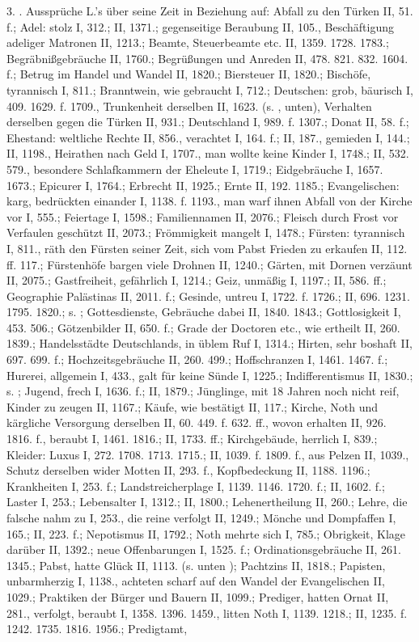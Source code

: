 3. . Aussprüche L.’s über seine Zeit in Beziehung auf: Abfall zu den Türken II, 51. f.; Adel: stolz I, 312.; II, 1371.; gegenseitige Beraubung II, 105., Beschäftigung adeliger Matronen II, 1213.; Beamte, Steuerbeamte etc. II, 1359. 1728. 1783.; Begräbnißgebräuche II, 1760.; Begrüßungen und Anreden II, 478. 821. 832. 1604. f.; Betrug im Handel und Wandel II, 1820.; Biersteuer II, 1820.; Bischöfe, tyrannisch I, 811.; Branntwein, wie gebraucht I, 712.; Deutschen: grob, bäurisch I, 409. 1629. f. 1709., Trunkenheit derselben II, 1623. (s. , unten), Verhalten derselben gegen die Türken II, 931.; Deutschland I, 989. f. 1307.; Donat II, 58. f.; Ehestand: weltliche Rechte II, 856., verachtet I, 164. f.; II, 187., gemieden I, 144.; II, 1198., Heirathen nach Geld I, 1707., man wollte keine Kinder I, 1748.; II, 532. 579., besondere Schlafkammern der Eheleute I, 1719.; Eidgebräuche I, 1657. 1673.; Epicurer I, 1764.; Erbrecht II, 1925.; Ernte II, 192. 1185.; Evangelischen: karg, bedrückten einander I, 1138. f. 1193., man warf ihnen Abfall von der Kirche vor I, 555.; Feiertage I, 1598.; Familiennamen II, 2076.; Fleisch durch Frost vor Verfaulen geschützt II, 2073.; Frömmigkeit mangelt I, 1478.; Fürsten: tyrannisch I, 811., räth den Fürsten seiner Zeit, sich vom Pabst Frieden zu erkaufen II, 112. ff. 117.; Fürstenhöfe bargen viele Drohnen II, 1240.; Gärten, mit Dornen verzäunt II, 2075.; Gastfreiheit, gefährlich I, 1214.; Geiz, unmäßig I, 1197.; II, 586. ff.; Geographie Palästinas II, 2011. f.; Gesinde, untreu I, 1722. f. 1726.; II, 696. 1231. 1795. 1820.; s. ; Gottesdienste, Gebräuche dabei II, 1840. 1843.; Gottlosigkeit I, 453. 506.; Götzenbilder II, 650. f.; Grade der Doctoren etc., wie ertheilt II, 260. 1839.; Handelsstädte Deutschlands, in üblem Ruf I, 1314.; Hirten, sehr boshaft II, 697. 699. f.; Hochzeitsgebräuche II, 260. 499.; Hoffschranzen I, 1461. 1467. f.; Hurerei, allgemein I, 433., galt für keine Sünde I, 1225.; Indifferentismus II, 1830.; s. ; Jugend, frech I, 1636. f.; II, 1879.; Jünglinge, mit 18 Jahren noch nicht reif, Kinder zu zeugen II, 1167.; Käufe, wie bestätigt II, 117.; Kirche, Noth und kärgliche Versorgung derselben II, 60. 449. f. 632. ff., wovon erhalten II, 926. 1816. f., beraubt I, 1461. 1816.; II, 1733. ff.; Kirchgebäude, herrlich I, 839.; Kleider: Luxus I, 272. 1708. 1713. 1715.; II, 1039. f. 1809. f., aus Pelzen II, 1039., Schutz derselben wider Motten II, 293. f., Kopfbedeckung II, 1188. 1196.; Krankheiten I, 253. f.; Landstreicherplage I, 1139. 1146. 1720. f.; II, 1602. f.; Laster I, 253.; Lebensalter I, 1312.; II, 1800.; Lehenertheilung II, 260.; Lehre, die falsche nahm zu I, 253., die reine verfolgt II, 1249.; Mönche und Dompfaffen I, 165.; II, 223. f.; Nepotismus II, 1792.; Noth mehrte sich I, 785.; Obrigkeit, Klage darüber II, 1392.; neue Offenbarungen I, 1525. f.; Ordinationsgebräuche II, 261. 1345.; Pabst, hatte Glück II, 1113. (s. unten ); Pachtzins II, 1818.; Papisten, unbarmherzig I, 1138., achteten scharf auf den Wandel der Evangelischen II, 1029.; Praktiken der Bürger und Bauern II, 1099.; Prediger, hatten Ornat II, 281., verfolgt, beraubt I, 1358. 1396. 1459., litten Noth I, 1139. 1218.; II, 1235. f. 1242. 1735. 1816. 1956.; Predigtamt, 